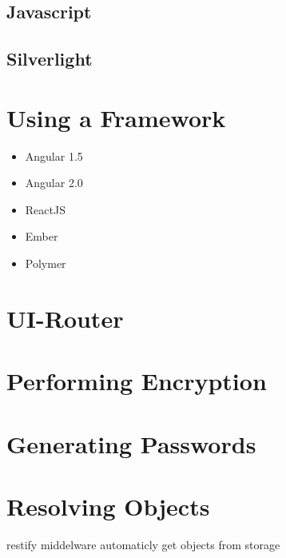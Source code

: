 		\subsection{Javascript}
		\subsection{Silverlight}


	\section{Using a Framework}
		\begin{itemize}
			\item Angular 1.5
			\item Angular 2.0
			\item ReactJS
			\item Ember
			\item Polymer
		\end{itemize}


	\section{UI-Router}
		\label{sec:impl:ui-router}

	\section{Performing Encryption}

	\section{Generating Passwords}


	
	\section{Resolving Objects}
		restify middelware automaticly get objects from storage
